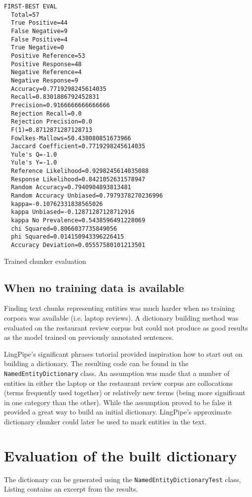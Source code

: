 \begin{listing}
\begin{verbatim}
FIRST-BEST EVAL
  Total=57
  True Positive=44
  False Negative=9
  False Positive=4
  True Negative=0
  Positive Reference=53
  Positive Response=48
  Negative Reference=4
  Negative Response=9
  Accuracy=0.7719298245614035
  Recall=0.8301886792452831
  Precision=0.9166666666666666
  Rejection Recall=0.0
  Rejection Precision=0.0
  F(1)=0.8712871287128713
  Fowlkes-Mallows=50.438080851673966
  Jaccard Coefficient=0.7719298245614035
  Yule's Q=-1.0
  Yule's Y=-1.0
  Reference Likelihood=0.9298245614035088
  Response Likelihood=0.8421052631578947
  Random Accuracy=0.7940904893813481
  Random Accuracy Unbiased=0.7979378270236996
  kappa=-0.10762331838565026
  kappa Unbiased=-0.12871287128712916
  kappa No Prevalence=0.5438596491228069
  chi Squared=0.8066037735849056
  phi Squared=0.014150943396226415
  Accuracy Deviation=0.05557580101213501
\end{verbatim}
\caption{Trained chunker evaluation}
\label{listing:trainedChunkerEval}
\end{listing}

\subsection*{When no training data is available}
Finding text chunks representing entities was much harder when no training
corpora was available (i.e. laptop reviews). A dictionary building method was
evaluated on the restaurant review corpus but could not produce as good results
as the model trained on previously annotated sentences.

LingPipe's significant phrases tutorial\cite{LingPipeSP} provided inspiration
how to start out on building a dictionary. The resulting code can be found in the
\verb|NamedEntityDictionary| class. An assumption was made that a number of
entities in either the laptop or the restaurant review corpus are collocations
(terms frequently used together) or relatively new terms (being more significant
in one category than the other). While the assumption proved to be false it
provided a great way to build an initial dictionary. LingPipe's approximate
dictionary chunker could later be used to mark entities in the text.

\section*{Evaluation of the built dictionary}
The dictionary can be generated using the \verb|NamedEntityDictionaryTest|
class, Listing  contains an excerpt from the results.

